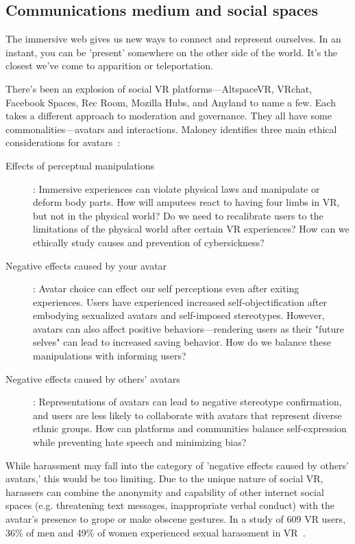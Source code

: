 \subsection{Communications medium and social spaces} \label{subsec:communications}
The immersive web gives us new ways to connect and represent ourselves. In an instant, you can be 'present' somewhere on the other side of the world. It's the closest we've come to apparition or teleportation.

There's been an explosion of social VR platforms---AltspaceVR, VRchat, Facebook Spaces, Rec Room, Mozilla Hubs, and Anyland to name a few. Each takes a different approach to moderation and governance. They all have some commonalities---avatars and interactions. Maloney identifies three main ethical considerations for avatars~\cite{maloney}:
\begin{description}
	\item[ Effects of perceptual manipulations]: Immersive experiences can violate physical laws and manipulate or deform body parts. How will amputees react to having four limbs in VR, but not in the physical world? Do we need to recalibrate users to the limitations of the physical world after certain VR experiences? How can we ethically study causes and prevention of cybersickness?
	\item [Negative effects caused by your avatar]: Avatar choice can effect our self perceptions even after exiting experiences. Users have experienced increased self-objectification after embodying sexualized avatars and self-imposed stereotypes. However, avatars can also affect positive behaviors---rendering users as their "future selves" can lead to increased saving behavior. How do we balance these manipulations with informing users?
	\item [Negative effects caused by others' avatars]: Representations of avatars can lead to negative stereotype confirmation, and users are less likely to collaborate with avatars that represent diverse ethnic groups. How can platforms and communities balance self-expression while preventing hate speech and minimizing bias?
\end{description}

While harassment may fall into the category of 'negative effects caused by others' avatars,' this would be too limiting. Due to the unique nature of social VR, harassers can combine the anonymity and capability of other internet social spaces (e.g. threatening text messages, inappropriate verbal conduct) with the avatar's presence to grope or make obscene gestures. In a study of 609 VR users, 36\% of men and 49\% of women experienced sexual harassment in VR~\cite{outlaw2018}.

